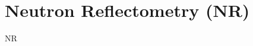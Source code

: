 \documentclass[\main/dresen_thesis.tex]{subfiles}
\begin{document}
  \section{Neutron Reflectometry (NR)}
    \label{app:methods:nr}
    NR
\end{document}
